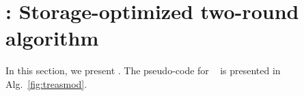 \section{\treasmod: Storage-optimized two-round algorithm}\label{sec:treasmod}
In this section,  we present  \treasmod{}. The pseudo-code for  ~\treasmod{} is presented in  Alg.~\ref{fig:treasmod}. 
